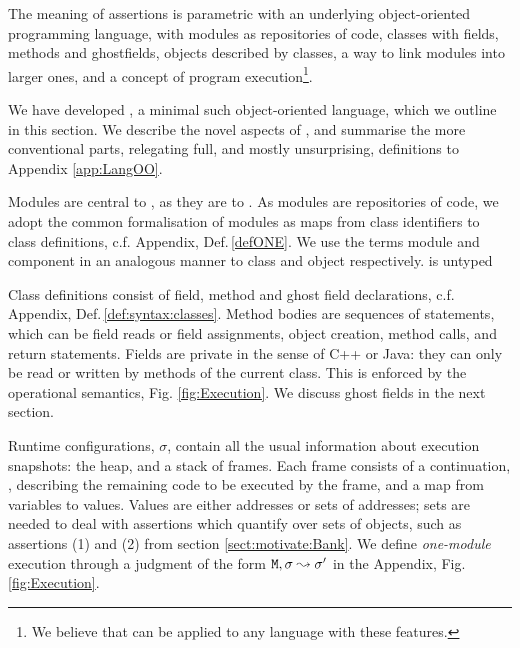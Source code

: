 \renewcommand{\appref}[1]{, c.f. Appendix, Def.\,\ref{#1}}
 
The meaning of \Chainmail assertions is parametric with an
underlying object-oriented programming language, with modules  as repositories of code, classes with fields, methods and
ghostfields, objects described by classes, a way to link  modules into larger ones, and a concept of 
program execution\footnote{We believe that \Chainmail can be applied to 
any language with these features.}.

We have developed   \LangOO, a minimal such object-oriented language, which we
outline in  this section. 
We  describe the novel aspects of \LangOO, and 
summarise the more conventional parts, relegating  full, and mostly unsurprising,
definitions %
to Appendix \ref{app:LangOO}.
 

Modules are central to \LangOO, as they are to \Chainmail. As modules are repositories
of code, we adopt the common formalisation of modules as maps from 
class identifiers to class definitions\appref{defONE}. We use the terms module and component in an
analogous manner to class and object respectively.  \LangOO is untyped 

 Class
definitions consist of field, method and ghost field declarations\appref{def:syntax:classes}.
Method bodies are sequences of 
statements, which  can be field reads or field assignments, object
creation, method calls, and return statements. 
Fields are private in the sense of C++ or Java: they can only be read or
written by methods of the current class.
This is enforced by the operational semantics, \cf Fig.  \ref{fig:Execution}.
We  discuss ghost fields in the next section.

Runtime configurations, $\sigma$,  contain   all the usual information about execution snapshots: the heap, and a
stack of frames. 
%
Each frame consists of a continuation, , describing the remaining code to be executed by the
frame, and a map from
variables to values. Values are either addresses or sets of addresses; sets 
are needed to deal with assertions which quantify over sets of
objects, such as assertions
(1) and (2) from section \ref{sect:motivate:Bank}.
% 
We define \emph{one-module} execution  through a judgment of the form ${\mbox{\tt{\ensuremath{{\mbox{\tt{M}}}}}}}, \sigma \leadsto \sigma'$ in the Appendix, Fig.  \ref{fig:Execution}. 
%
  

